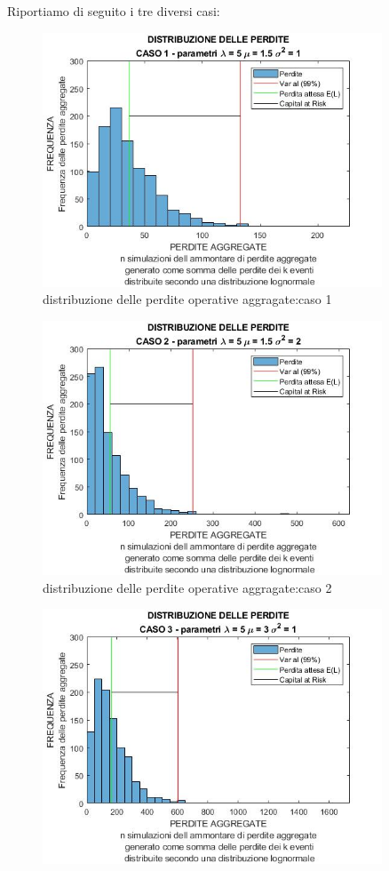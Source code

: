 \documentclass[titlepage]{article}
\begin{document}
\begin{itemize}
Riportiamo di seguito i tre diversi casi:
\begin{figure}[htbp]
	\centering
	\includegraphics[width=0.9\textwidth]{LOSS1.jpg}
	\caption{\label{fig:losss.png}distribuzione delle perdite operative aggragate:caso 1}
\end{figure}
\begin{figure}[htbp]
	\centering
	\includegraphics[width=0.9\textwidth]{LOSS2.jpg}
	\caption{\label{fig:losss.png}distribuzione delle perdite operative aggragate:caso 2}
\end{figure}
\begin{figure}[htbp]
	\centering
	\includegraphics[width=0.9\textwidth]{LOSS3.jpg}

\end{figure}
\end{itemize}
\end{document}

